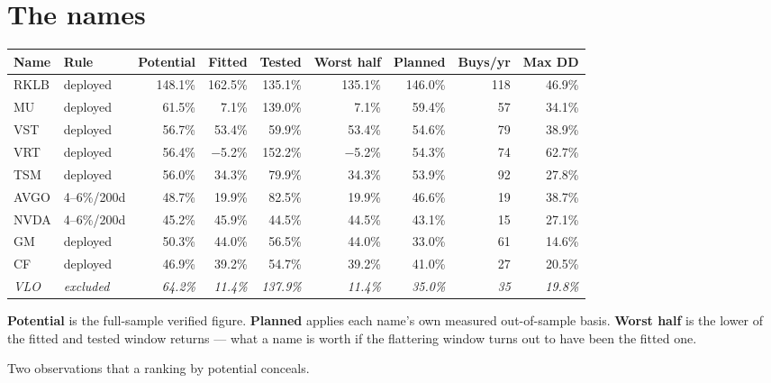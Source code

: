 \documentclass[11pt]{article}
\begin{document}
\section{The names}

\begin{table}[H]\centering\small
\begin{tabular}{llrrrrrrr}
\toprule
\textbf{Name} & \textbf{Rule} & \textbf{Potential} & \textbf{Fitted} & \textbf{Tested} &
\textbf{Worst half} & \textbf{Planned} & \textbf{Buys/yr} & \textbf{Max DD} \\
\midrule
\rowcolor{bcpanel}
RKLB & deployed    & 148.1\% & 162.5\% & 135.1\% & 135.1\% & 146.0\% & 118 & 46.9\% \\
MU   & deployed    &  61.5\% &   7.1\% & 139.0\% &   7.1\% &  59.4\% &  57 & 34.1\% \\
\rowcolor{bcpanel}
VST  & deployed    &  56.7\% &  53.4\% &  59.9\% &  53.4\% &  54.6\% &  79 & 38.9\% \\
VRT  & deployed    &  56.4\% & $-$5.2\% & 152.2\% & $-$5.2\% & 54.3\% & 74 & 62.7\% \\
\rowcolor{bcpanel}
TSM  & deployed    &  56.0\% &  34.3\% &  79.9\% &  34.3\% &  53.9\% &  92 & 27.8\% \\
\midrule
AVGO & 4--6\%/200d &  48.7\% &  19.9\% &  82.5\% &  19.9\% &  46.6\% &  19 & 38.7\% \\
\rowcolor{bcpanel}
NVDA & 4--6\%/200d &  45.2\% &  45.9\% &  44.5\% &  44.5\% &  43.1\% &  15 & 27.1\% \\
\midrule
GM   & deployed    &  50.3\% &  44.0\% &  56.5\% &  44.0\% &  33.0\% &  61 & 14.6\% \\
\rowcolor{bcpanel}
CF   & deployed    &  46.9\% &  39.2\% &  54.7\% &  39.2\% &  41.0\% &  27 & 20.5\% \\
\midrule
\textit{VLO} & \textit{excluded} & \textit{64.2\%} & \textit{11.4\%} & \textit{137.9\%} &
\textit{11.4\%} & \textit{35.0\%} & \textit{35} & \textit{19.8\%} \\
\bottomrule
\end{tabular}
\end{table}

\textbf{Potential} is the full-sample verified figure. \textbf{Planned} applies each name's own
measured out-of-sample basis. \textbf{Worst half} is the lower of the fitted and tested window
returns --- what a name is worth if the flattering window turns out to have been the fitted one.

Two observations that a ranking by potential conceals.
\end{document}

